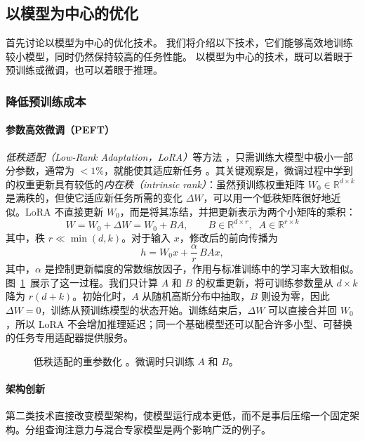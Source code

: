\subsection{以模型为中心的优化}
首先讨论以模型为中心的优化技术。
我们将介绍以下技术，它们能够高效地训练较小模型，同时仍然保持较高的任务性能。
以模型为中心的技术，既可以着眼于预训练或微调，也可以着眼于推理。

\subsubsection{降低预训练成本}

\paragraph{参数高效微调（PEFT）}

{\em 低秩适配（Low-Rank Adaptation，LoRA）}等方法 \citep{hu2021lora}，只需训练大模型中极小一部分参数，通常为 $<1$\%，就能使其适应新任务 \citep{lialin2023scaling}。其关键观察是，微调过程中学到的权重更新具有较低的{\em 内在秩（intrinsic rank）}：虽然预训练权重矩阵
$W_0 \in \mathbb{R}^{d \times k}$
是满秩的，但使它适应新任务所需的变化 $\Delta W$，可以用一个低秩矩阵很好地近似。LoRA 不直接更新 $W_0$，而是将其冻结，并把更新表示为两个小矩阵的乘积：
\begin{equation}
    W = W_0 + \Delta W = W_0 + B A, \qquad B \in \mathbb{R}^{d \times r}, \;\; A \in \mathbb{R}^{r \times k}
\end{equation}
其中，秩 $r \ll \min(d, k)$。对于输入 $x$，修改后的前向传播为
\begin{equation}
    h = W_0 x + \frac{\alpha}{r}\, B A x,
\end{equation}
其中，$\alpha$ 是控制更新幅度的常数缩放因子，作用与标准训练中的学习率大致相似。图~\ref{fig:lora}~展示了这一过程。我们只计算 $A$ 和 $B$ 的权重更新，将可训练参数量从 $d \times k$ 降为 $r(d + k)$。初始化时，$A$ 从随机高斯分布中抽取，$B$ 则设为零，因此 $\Delta W = 0$，训练从预训练模型的状态开始。训练结束后，$\Delta W$ 可以直接合并回 $W_0$，所以 LoRA 不会增加推理延迟；同一个基础模型还可以配合许多小型、可替换的任务专用适配器提供服务。

\begin{figure}[t]
    \centering
    
    \caption{低秩适配的重参数化 \citep{hu2021lora}。微调时只训练 $A$ 和 $B$。}
    \label{fig:lora}
\end{figure}

\paragraph{架构创新}
第二类技术直接改变模型架构，使模型运行成本更低，而不是事后压缩一个固定架构。分组查询注意力与混合专家模型是两个影响广泛的例子。


